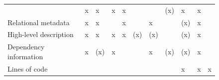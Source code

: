 \documentclass{article}
\begin{document}
\begin{figure}
\begin{tabular}{lllllllllll}
& x

& x

& x

& x

& 

& 

& (x)

& x

& x

\\
Relational metadata

& x

& x

& 

& x

& 

& x

& 

& (x)

& x

& 

\\
High-level description

& x

& x

& x

& x

& (x)

& (x)

& 

& (x)

& x

& 

\\
Dependency information

& x

& (x)

& x

& 

& 

& x

& (x)

& (x)

& x

& 

\\
Lines of code

& 

& 

& 

& 

& 

& 

& 

& x

& x

& x


\end{tabular}
\end{figure}
\end{document}

